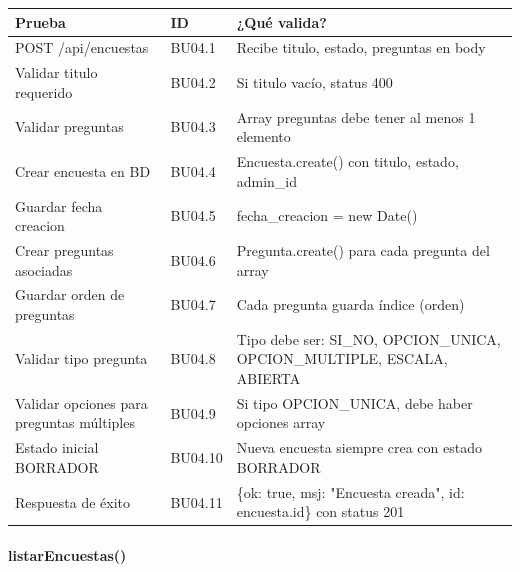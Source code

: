 \begin{table}[H]
\centering
\begin{tabular}{|l|l|p{6cm}|}
\hline
\textbf{Prueba} & \textbf{ID} & \textbf{¿Qué valida?} \\ \hline
POST /api/encuestas & BU04.1 & Recibe titulo, estado, preguntas en body \\ \hline
Validar titulo requerido & BU04.2 & Si titulo vacío, status 400 \\ \hline
Validar preguntas & BU04.3 & Array preguntas debe tener al menos 1 elemento \\ \hline
Crear encuesta en BD & BU04.4 & Encuesta.create() con titulo, estado, admin\_id \\ \hline
Guardar fecha creacion & BU04.5 & fecha\_creacion = new Date() \\ \hline
Crear preguntas asociadas & BU04.6 & Pregunta.create() para cada pregunta del array \\ \hline
Guardar orden de preguntas & BU04.7 & Cada pregunta guarda índice (orden) \\ \hline
Validar tipo pregunta & BU04.8 & Tipo debe ser: SI\_NO, OPCION\_UNICA, OPCION\_MULTIPLE, ESCALA, ABIERTA \\ \hline
Validar opciones para preguntas múltiples & BU04.9 & Si tipo OPCION\_UNICA, debe haber opciones array \\ \hline
Estado inicial BORRADOR & BU04.10 & Nueva encuesta siempre crea con estado BORRADOR \\ \hline
Respuesta de éxito & BU04.11 & \{ok: true, msj: "Encuesta creada", id: encuesta.id\} con status 201 \\ \hline
\end{tabular}
\end{table}

\paragraph{listarEncuestas()}


